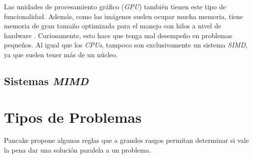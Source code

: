 Las unidades de procesamiento gráfico (\textit{GPU})  también tienen
este tipo de funcionalidad. Además, como las imágenes suelen ocupar mucha
memoria, tiene memoria de gran tamaño optimizada para el manejo con hilos a
nivel de hardware . Curiosamente, esto hace que tenga mal
desempeño en problemas pequeños. Al igual que los \textit{CPUs}, tampoco son
exclusivamente un sistema \textit{SIMD}, ya que suelen tener más de un núcleo.

\subsection{Sistemas \textit{MIMD}}

\section{Tipos de Problemas}

Pancake \cite{Pancake1996} propone algunas reglas que a grandes rasgos permitan
determinar si vale la pena dar una solución paralela a un problema.

